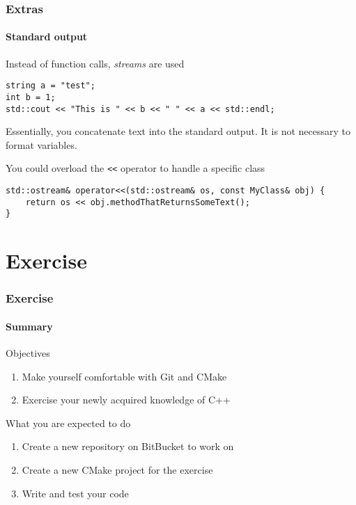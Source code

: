 \begin{frame}[fragile]
\frametitle{Extras}
\framesubtitle{Standard output}

\begin{block}{Instead of function calls, {\em streams} are used}

{\scriptsize 
\begin{verbatim}
string a = "test";
int b = 1;
std::cout << "This is " << b << " " << a << std::endl;
\end{verbatim}
}

Essentially, you concatenate text into the standard output. It is not necessary to format variables.
\end{block}
\pause
\begin{block}{You could overload the \texttt{<\;\!\!<} operator to handle a specific class}
{\scriptsize 
\begin{verbatim}
std::ostream& operator<<(std::ostream& os, const MyClass& obj) {
    return os << obj.methodThatReturnsSomeText();
}
\end{verbatim}
}
\end{block}

\end{frame}

\section{Exercise}

\begin{frame}
\frametitle{Exercise}
\framesubtitle{Summary}

\begin{block}{Objectives}
\begin{enumerate}
\item Make yourself comfortable with Git and CMake
\item Exercise your newly acquired knowledge of C++
\end{enumerate}
\end{block}
\pause
\begin{block}{What you are expected to do}
\begin{enumerate}
\item Create a new repository on BitBucket to work on
\item Create a new CMake project for the exercise
\item Write and test your code
\end{enumerate}
\end{block}

\end{frame}

